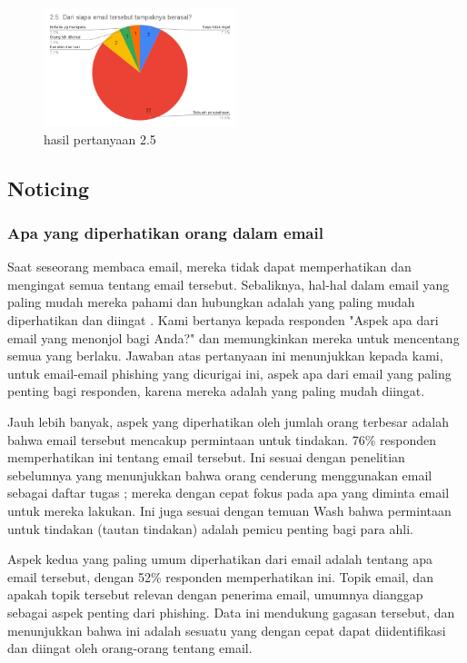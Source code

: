 \documentclass[lettersize,journal]{IEEEtran}
\begin{document}
\begin{figure}[h!]
  \centering
  \includegraphics[width=0.5\textwidth]{image/2.5.png}
  \caption{hasil pertanyaan 2.5}
  \label{fig:pertanyaan_2.5}
\end{figure}

\subsection{Noticing}

\subsubsection{Apa yang diperhatikan orang dalam email}

Saat seseorang membaca email, mereka tidak dapat memperhatikan dan mengingat
semua tentang email tersebut. Sebaliknya, hal-hal dalam email yang paling mudah
mereka pahami dan hubungkan adalah yang paling mudah diperhatikan dan diingat
\cite{satudelapan}. Kami bertanya kepada responden "Aspek apa dari email yang
menonjol bagi Anda?" dan memungkinkan mereka untuk mencentang semua yang
berlaku. Jawaban atas pertanyaan ini menunjukkan kepada kami, untuk email-email
phishing yang dicurigai ini, aspek apa dari email yang paling penting bagi
responden, karena mereka adalah yang paling mudah diingat.

Jauh lebih banyak, aspek yang diperhatikan oleh jumlah orang terbesar adalah
bahwa email tersebut mencakup permintaan untuk tindakan. 76\% responden
memperhatikan ini tentang email tersebut. Ini sesuai dengan penelitian
sebelumnya yang menunjukkan bahwa orang cenderung menggunakan email sebagai
daftar tugas \cite{tigaenam}; mereka dengan cepat fokus pada apa yang diminta
email untuk mereka lakukan. Ini juga sesuai dengan temuan Wash \cite{tigaempat}
bahwa permintaan untuk tindakan (tautan tindakan) adalah pemicu penting bagi
para ahli.

Aspek kedua yang paling umum diperhatikan dari email adalah tentang apa email
tersebut, dengan 52\% responden memperhatikan ini. Topik email, dan apakah
topik tersebut relevan dengan penerima email, umumnya dianggap sebagai aspek
penting dari phishing. Data ini mendukung gagasan tersebut, dan menunjukkan
bahwa ini adalah sesuatu yang dengan cepat dapat diidentifikasi dan diingat
oleh orang-orang tentang email.
\end{document}
